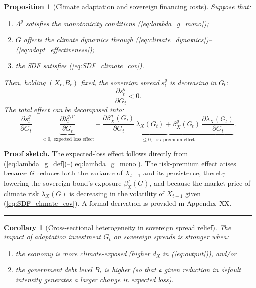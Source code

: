 \documentclass[12pt]{article}
\newtheorem{corollary}[theorem]{Corollary}
\newtheorem{proposition}{Proposition}
\newenvironment{proof}[1][Proof]{\noindent\textbf{#1.} }{\ \rule{0.5em}{0.5em}}
\begin{document}
\begin{proposition}[Climate adaptation and sovereign financing costs]
\label{prop:sg_G}
Suppose that:
\begin{enumerate}
  \item $\Lambda^g$ satisfies the monotonicity conditions
        (\ref{eq:lambda_g_mono});
  \item $G$ affects the climate dynamics through
        (\ref{eq:climate_dynamics})--(\ref{eq:adapt_effectiveness});
  \item the SDF satisfies (\ref{eq:SDF_climate_cov}).
\end{enumerate}
Then, holding $(X_t,B_t)$ fixed, the sovereign spread $s^g_t$ is decreasing
in $G_t$:
\begin{equation}
  \frac{\partial s^g_t}{\partial G_t} < 0.
  \label{eq:dsg_dG}
\end{equation}
The total effect can be decomposed into:
\[
  \frac{\partial s^g_t}{\partial G_t}
  =
  \underbrace{\frac{\partial \lambda^{g,\mathbb{P}}_t}{\partial G_t}}_{<0,\;\text{expected loss effect}}
  +
  \underbrace{\frac{\partial \beta^g_X(G_t)}{\partial G_t}\, \lambda_X(G_t)
  + \beta^g_X(G_t)\, \frac{\partial \lambda_X(G_t)}{\partial G_t}}_{\le 0,\;\text{risk premium effect}}.
\]
\end{proposition}

\begin{proof}[Proof sketch]
The expected-loss effect follows directly from
(\ref{eq:lambda_g_def})--(\ref{eq:lambda_g_mono}). The risk-premium effect
arises because $G$ reduces both the variance of $X_{t+1}$ and its
persistence, thereby lowering the sovereign bond's exposure $\beta^g_X(G)$,
and because the market price of climate risk $\lambda_X(G)$ is decreasing
in the volatility of $X_{t+1}$ given (\ref{eq:SDF_climate_cov}). A formal
derivation is provided in Appendix~XX.
\end{proof}

\begin{corollary}[Cross-sectional heterogeneity in sovereign spread relief]
\label{cor:sg_heterogeneity}
The impact of adaptation investment $G_t$ on sovereign spreads is stronger
when:
\begin{enumerate}
  \item the economy is more climate-exposed (higher $d_X$ in
        (\ref{eq:output})), and/or
  \item the government debt level $B_t$ is higher (so that a given
        reduction in default intensity generates a larger change in
        expected loss).
\end{enumerate}
\end{corollary}
\end{document}

